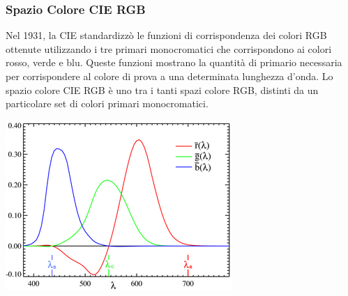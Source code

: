 \documentclass[a4paper,11pt]{article} %
\begin{document}
\subsubsection{Spazio Colore CIE RGB}
\begin{minipage}{0.65\textwidth}
Nel 1931, la CIE standardizzò le funzioni di corrispondenza dei colori RGB ottenute utilizzando i tre primari monocromatici che corrispondono ai colori rosso, verde e blu. Queste funzioni mostrano la quantità di primario necessaria per corrispondere al colore di prova a una determinata lunghezza d'onda. Lo spazio colore CIE RGB è uno tra i tanti spazi colore RGB, distinti da un particolare set di colori primari monocromatici.
\end{minipage}
\begin{minipage}{0.05\textwidth}
\end{minipage}
\begin{minipage}{0.3\textwidth}
    \includegraphics[width=\linewidth]{RGBfunction}
\end{minipage}
\end{document}
